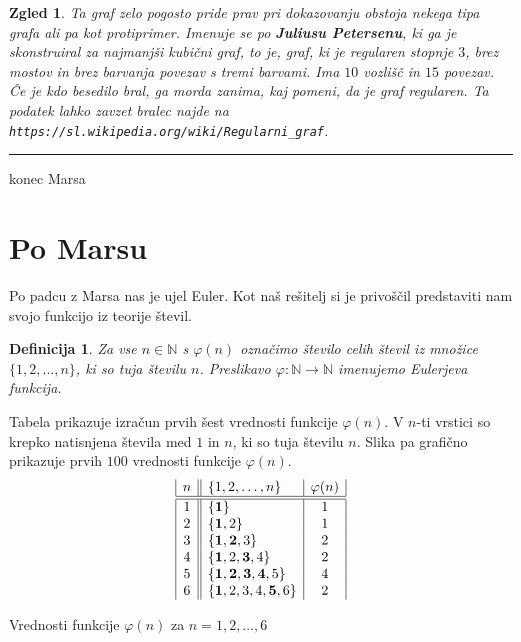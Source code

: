 \documentclass[a4paper,12pt]{article}
\newtheorem{definicija}{Definicija}
\newtheorem{zgled}{Zgled}
\begin{document}
\begin{zgled}
{Ta graf zelo pogosto pride prav pri dokazovanju obstoja nekega tipa grafa ali pa kot protiprimer. Imenuje se po \textbf{Juliusu Petersenu}, ki ga je skonstruiral za najmanjši kubični graf, to je, graf, ki je regularen stopnje $3$, brez mostov in brez barvanja povezav s tremi barvami. Ima $10$ vozlišč in $15$ povezav. Če je kdo besedilo bral, ga morda zanima, kaj pomeni, da je graf regularen. Ta podatek lahko zavzet bralec najde na \\ 
\verb|https://sl.wikipedia.org/wiki/Regularni_graf|.
}
\end{zgled}

\noindent
{\color{RubineRed} \rule{\linewidth}{0.5mm} konec Marsa }

\section{Po Marsu}
Po padcu z Marsa nas je ujel Euler. Kot naš rešitelj si je privoščil predstaviti nam svojo funkcijo iz teorije števil.

\begin{definicija}
Za vse $n \in \mathbb{N}$ s $\varphi (n)$ označimo število celih števil iz množice
$\{1, 2, . . . , n\}$, ki so tuja številu $n$. Preslikavo $\varphi : \mathbb{N} \rightarrow \mathbb{N}$ imenujemo Eulerjeva
funkcija.
\end{definicija}
\newpage


\begin{table}[h!]
Tabela prikazuje izračun prvih šest vrednosti funkcije $\varphi (n)$. V $n$-ti
vrstici so krepko natisnjena števila med $1$ in $n$, ki so tuja številu $n$. Slika pa grafično prikazuje prvih $100$ vrednosti funkcije $\varphi (n)$.
\[
\begin{array}{|c||l|c|}
 n & \{1,2,\ldots, n\}          & \varphi(n)       \\
 \hline
\hline
 1 & \{{\bf 1}\}                    &     1      \\
 2 & \{{\bf 1},2 \}                &     1      \\
 3 & \{{\bf 1,2},3 \}             &     2      \\
 4 & \{{\bf 1},2,{\bf 3},4 \} &     2      \\
 5 & \{{\bf 1,2,3,4},5 \}       &     4      \\
 6 & \{{\bf 1},2,3,4,{\bf 5},6 \} &     2
\end{array}
\] 
\caption{Vrednosti funkcije $\varphi(n)$ za $n = 1,2,\ldots,6$}\label{fi}
\end{table}
\end{document}
